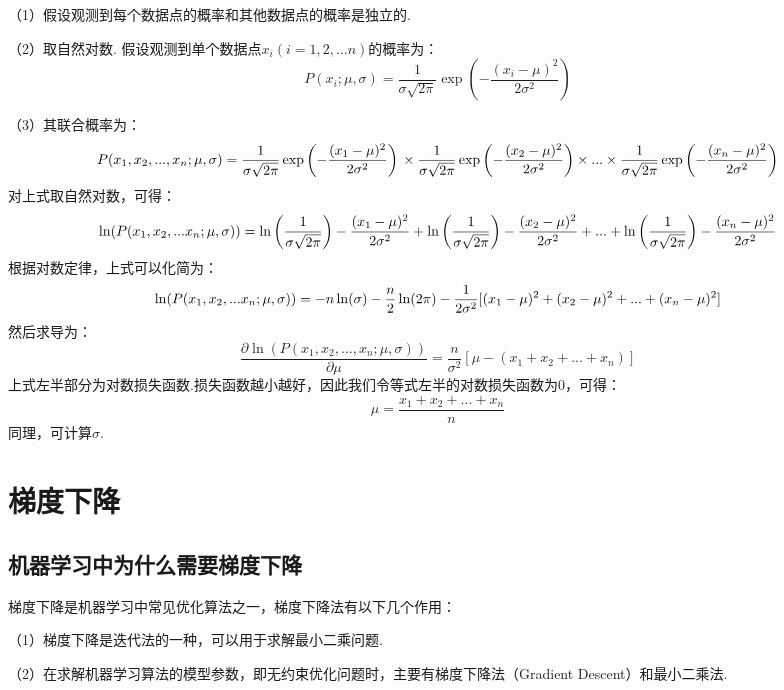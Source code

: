 （1）假设观测到每个数据点的概率和其他数据点的概率是独立的.

（2）取自然对数. 假设观测到单个数据点$x_i(i=1,2,...n)$的概率为： \[
P(x_i;\mu,\sigma)=\frac{1}{\sigma \sqrt{2\pi}}\exp 
        \left( - \frac{(x_i-\mu)^2}{2\sigma^2} \right)
\]

（3）其联合概率为： \[
P(x_1,x_2,...,x_n;\mu,\sigma)=\frac{1}{\sigma \sqrt{2\pi}}\exp 
        \left( - \frac{(x_1-\mu)^2}{2\sigma^2} \right) \\ \times
         \frac{1}{\sigma \sqrt{2\pi}}\exp 
        \left( - \frac{(x_2-\mu)^2}{2\sigma^2} \right) \times ... \times
        \frac{1}{\sigma \sqrt{2\pi}}\exp 
        \left( - \frac{(x_n-\mu)^2}{2\sigma^2} \right)
\] ​ 对上式取自然对数，可得： \[
 \ln(P(x_1,x_2,...x_n;\mu,\sigma))=
        \ln \left(\frac{1}{\sigma \sqrt{2\pi}} \right) 
         - \frac{(x_1-\mu)^2}{2\sigma^2}  \\ +
         \ln \left( \frac{1}{\sigma \sqrt{2\pi}} \right) 
         - \frac{(x_2-\mu)^2}{2\sigma^2} +...+
         \ln \left( \frac{1}{\sigma \sqrt{2\pi}} \right) 
         - \frac{(x_n-\mu)^2}{2\sigma^2}
\] 根据对数定律，上式可以化简为： \[
\ln(P(x_1,x_2,...x_n;\mu,\sigma))=-n\ln(\sigma)-\frac{n}{2} \ln(2\pi)\\
        -\frac{1}{2\sigma^2}[(x_1-\mu)^2+(x_2-\mu)^2+...+(x_n-\mu)^2]
\] 然后求导为： \[
\frac{\partial\ln(P(x_1,x_2,...,x_n;\mu,\sigma))}{\partial\mu}=
                \frac{n}{\sigma^2}[\mu - (x_1+x_2+...+x_n)]
\] ​
上式左半部分为对数损失函数.损失函数越小越好，因此我们令等式左半的对数损失函数为0，可得：
\[
\mu=\frac{x_1+x_2+...+x_n}{n}
\] 同理，可计算$\sigma ​$.

\section{ 梯度下降}\label{ux68afux5ea6ux4e0bux964d}

\subsection{机器学习中为什么需要梯度下降}\label{ux673aux5668ux5b66ux4e60ux4e2dux4e3aux4ec0ux4e48ux9700ux8981ux68afux5ea6ux4e0bux964d}

梯度下降是机器学习中常见优化算法之一，梯度下降法有以下几个作用：

（1）梯度下降是迭代法的一种，可以用于求解最小二乘问题.

（2）在求解机器学习算法的模型参数，即无约束优化问题时，主要有梯度下降法（Gradient
Descent）和最小二乘法.

